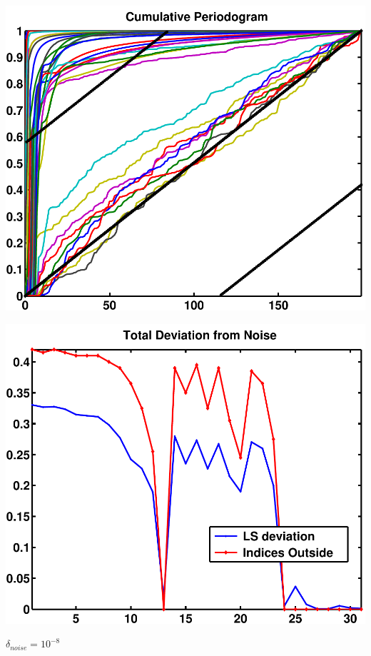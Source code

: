 \documentclass[11pt]{amsart}
\begin{document}
	\vspace{5mm}
	\begin{minipage}[t]{0.5\textwidth}
	
		\includegraphics[width=.95\linewidth]{figures/run2/cum_per} 
   
	\end{minipage}
	\begin{minipage}[t]{0.5\textwidth}
	
		\includegraphics[width=.95\linewidth]{figures/run2/total_deviation} 
   
	\end{minipage}
	\vspace{5mm}
	{\centering $\delta_{noise}=10^{-8}$}
	
\end{document}
